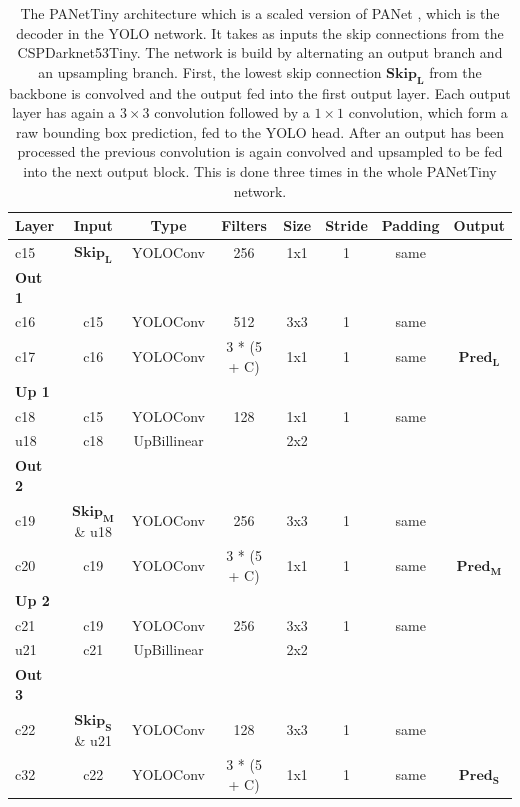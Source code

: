 \begin{table}
\begin{center}

\begin{tabular}{l|c|c|c|c|c|c|c}
    \textbf{Layer} & \textbf{Input} & \textbf{Type} & \textbf{Filters} & \textbf{Size} & \textbf{Stride} & \textbf{Padding} & \textbf{Output} \\
    \hline
    c15 & $\mathbf{Skip_L}$ & YOLOConv & 256 & 1x1 & 1 & same\\
    \textbf{Out 1} & & & & & &\\
    c16 & c15 & YOLOConv & 512 & 3x3 & 1 & same\\
    c17 & c16 & YOLOConv & 3 * (5 + C) & 1x1 & 1 & same & $\mathbf{Pred_L}$\\
    \textbf{Up 1}& & & & & &\\
    c18 & c15 & YOLOConv & 128 & 1x1 & 1 & same \\
    u18 & c18 & UpBillinear & & 2x2 & &\\
    \textbf{Out 2}& & & & & &\\
    c19 & $\mathbf{Skip_M}$ \& u18 & YOLOConv & 256 & 3x3 & 1 & same\\
    c20 & c19 & YOLOConv & 3 * (5 + C) & 1x1 & 1 & same & $\mathbf{Pred_M}$\\
    \textbf{Up 2}& & & & & &\\
    c21 & c19 & YOLOConv & 256 & 3x3 & 1 & same\\
    u21 & c21 & UpBillinear & & 2x2 & &\\
    \textbf{Out 3}& & & & & &\\
    c22 & $\mathbf{Skip_S}$ \& u21 & YOLOConv & 128 & 3x3 & 1 & same\\
    c32 & c22 & YOLOConv & 3 * (5 + C) & 1x1 & 1 & same & $\mathbf{Pred_S}$\\
\end{tabular}

\caption{The PANetTiny architecture which is a scaled version of PANet \cite{pannet}, which is the decoder in the YOLO network. It takes as inputs the skip connections from the CSPDarknet53Tiny. The network is build by alternating an output branch and an upsampling branch. First, the lowest skip connection $\mathbf{Skip_L}$ from the backbone is convolved and the output fed into the first output layer. Each output layer has again a $3\times3$ convolution followed by a $1\times1$ convolution, which form a raw bounding box prediction, fed to the YOLO head. After an output has been processed the previous convolution is again convolved and upsampled to be fed into the next output block. This is done three times in the whole PANetTiny network.}
\label{tab:panet_tiny_arch}
\end{center}
\end{table}


